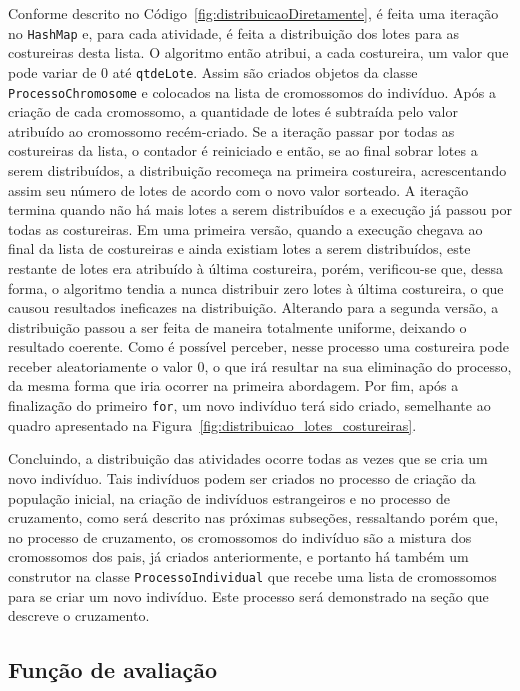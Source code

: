 \par Conforme descrito no Código~\ref{fig:distribuicaoDiretamente}, é feita uma
iteração no \texttt{HashMap} e, para cada atividade, é feita a distribuição dos lotes para
as costureiras desta lista. O algoritmo então atribui, a cada costureira, um valor
que pode variar de 0 até \texttt{qtdeLote}. Assim são criados objetos da classe \texttt{ProcessoChromosome} 
e colocados na lista de cromossomos do indivíduo. Após a criação de cada cromossomo, a quantidade de
lotes é subtraída pelo valor atribuído ao cromossomo recém-criado.
Se a iteração passar por todas as costureiras da lista, o contador é reiniciado e então, se ao final sobrar 
lotes a serem distribuídos, a distribuição recomeça na primeira costureira, acrescentando assim seu 
número de lotes de acordo com o novo valor sorteado. A iteração termina quando não há mais lotes a serem 
distribuídos e a execução já passou por todas as costureiras. Em uma primeira versão, quando a execução chegava
ao final da lista de costureiras e ainda existiam lotes a serem distribuídos, este restante de lotes era atribuído
à última costureira, porém, verificou-se que, dessa forma, o algoritmo tendia a nunca distribuir zero lotes à última
costureira, o que causou resultados ineficazes na distribuição. Alterando para a segunda versão, a distribuição  passou a 
ser feita de maneira totalmente uniforme, deixando o resultado coerente.
Como é possível perceber, nesse processo uma costureira pode receber aleatoriamente o valor 0, o que irá resultar na 
sua eliminação do processo, da mesma forma que iria ocorrer na primeira abordagem. Por fim, após a finalização do primeiro
\texttt{for}, um novo indivíduo terá sido criado, semelhante ao quadro
apresentado na Figura~\ref{fig:distribuicao_lotes_costureiras}.

\par Concluindo, a distribuição das atividades ocorre todas as vezes que se cria um novo indivíduo.
Tais indivíduos podem ser criados no processo de criação da população inicial, na criação de 
indivíduos estrangeiros e no processo de cruzamento, como será descrito nas próximas subseções,
ressaltando porém que, no processo de cruzamento, os cromossomos do indivíduo são a mistura dos cromossomos dos pais,
já criados anteriormente, e portanto há também um construtor na classe \texttt{ProcessoIndividual} que recebe uma lista de 
cromossomos para se criar um novo indivíduo. Este processo será demonstrado na seção que descreve o cruzamento.


\subsection{Função de avaliação}

